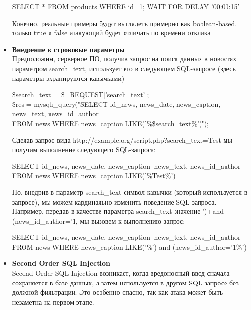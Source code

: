 \begin{itemize}
    \begin{grayquote}
        SELECT * FROM products WHERE id=1; WAIT FOR DELAY '00:00:15'
    \end{grayquote}
    Конечно, реальные примеры будут выглядеть примерно как boolean-based, только true и false атакующий будет отличать по времени отклика
    
        \item \textbf{Внедрение в строковые параметры}\\
   Предположим, серверное ПО, получив запрос на поиск данных в новостях параметром search\_text, использует его в следующем SQL-запросе (здесь параметры экранируются кавычками):\\
    \begin{grayquote}
    	\$search\_text = \$\_REQUEST['search\_text'];\\
    	\$res = mysqli\_query("SELECT id\_news, news\_date, news\_caption, news\_text, news\_id\_author\\
    	FROM news WHERE news\_caption LIKE('\%\$search\_text\%')");
    \end{grayquote}
    
    Сделав запрос вида http://example.org/script.php?search\_text=Test мы получим выполнение следующего SQL-запроса:\\
    \begin{grayquote}
    	SELECT id\_news, news\_date, news\_caption, news\_text, news\_id\_author FROM news 
    	WHERE news\_caption LIKE('\%Test\%')
    \end{grayquote}
    
        Но, внедрив в параметр search\_text символ кавычки (который используется в запросе), мы можем кардинально изменить поведение SQL-запроса. Например, передав в качестве параметра search\_text значение ')+and+(news\_id\_author='1, мы вызовем к выполнению запрос:\\
    \begin{grayquote}
    	SELECT id\_news, news\_date, news\_caption, news\_text, news\_id\_author FROM news 
    	WHERE news\_caption LIKE('\%') and (news\_id\_author='1\%')
    \end{grayquote}

	\item \textbf{Second Order SQL Injection}\\
	Second Order SQL Injection возникает, когда вредоносный ввод сначала сохраняется в базе данных, а затем используется в другом SQL-запросе без должной фильтрации. Это особенно опасно, так как атака может быть незаметна на первом этапе.


\end{itemize}
